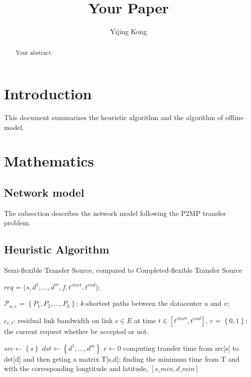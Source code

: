\documentclass[a4paper]{article}
\title{Your Paper}
\author{Yijing Kong}
{}
\begin{document}
\maketitle

\renewcommand{\algorithmicrequire}{\textbf{Input:}}  %
\renewcommand{\algorithmicensure}{\textbf{Output:}} %

\begin{abstract}
Your abstract.
\end{abstract}

\section{Introduction}

This document summarizes the heuristic algorithm and the algorithm of offline model.

\section{Mathematics}

\subsection{Network model}

The subsection describes the network model following the P2MP transfer problem.

\subsection{Heuristic Algorithm}

\noindent 

\begin{algorithm}[ht]
  \caption{Semi-flexible Transfer Source, compared to Completed-flexible Transfer Source}
  	\begin{algorithmic}[1]
  	\Require
      $req$ = ($s, d^{1},...,d^{m}, f, t^{start}, t^{end}$);

      {$\mathcal{P}$}{$_u$$_,$$_v$} = 
      $\left\{P_1, P_2, \ldots, P_k\right\}$: $k$-shortest paths between the datacenter $u$ and $v$;

      $c_{e, t}$: residual link bandwidth on link $e \in E$ at time $t \in [t^{start}, t^{end}]$.
    \Ensure
      $r$ = $\left\{0, 1\right\}$: the current request whether be accepted or not.
    
    \State $src \gets \left\{s\right\}$
    \State $dst \gets \left\{d^{1},...,d^{m}\right\}$
    \State $ r \gets 0$
            	\State computing transfer time from src[s] to dst[d]
            	and then geting a matrix T[s,d];
            \EndFor
        \EndFor
        \State finding the minimum time from T and with the corresponding longtitude and latitude, \State$[s\_min, d\_min]$
        \State 
    \EndWhile
    \State {}
    \end{algorithmic}
  	\label{recentEnd}
\end{algorithm}
\end{document}
